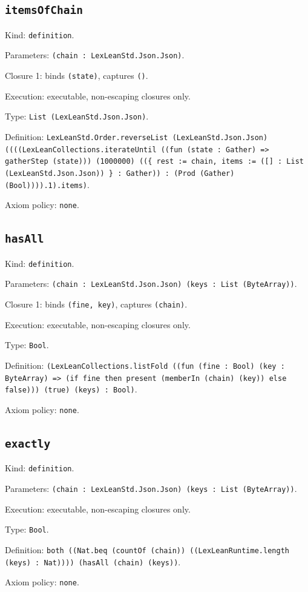 \documentclass[11pt]{article}
\begin{document}
\subsection*{\texttt{itemsOfChain}}
\noindent Kind: \texttt{definition}.\par
\noindent Parameters: \texttt{(chain : LexLeanStd.Json.Json)}.\par
\noindent Closure 1: binds \texttt{(state)}, captures \texttt{()}.\par
\noindent Execution: executable, non-escaping closures only.\par
\noindent Type: \texttt{List (LexLeanStd.Json.Json)}.\par
\noindent Definition: \texttt{LexLeanStd.Order.reverseList (LexLeanStd.Json.Json) ((((LexLeanCollections.iterateUntil ((fun (state : Gather) => gatherStep (state))) (1000000) ((\{ rest := chain, items := ([] : List (LexLeanStd.Json.Json)) \} : Gather)) : (Prod (Gather) (Bool)))).1).items)}.\par
\noindent Axiom policy: \texttt{none}.\par
\subsection*{\texttt{hasAll}}
\noindent Kind: \texttt{definition}.\par
\noindent Parameters: \texttt{(chain : LexLeanStd.Json.Json) (keys : List (ByteArray))}.\par
\noindent Closure 1: binds \texttt{(fine, key)}, captures \texttt{(chain)}.\par
\noindent Execution: executable, non-escaping closures only.\par
\noindent Type: \texttt{Bool}.\par
\noindent Definition: \texttt{(LexLeanCollections.listFold ((fun (fine : Bool) (key : ByteArray) => (if fine then present (memberIn (chain) (key)) else false))) (true) (keys) : Bool)}.\par
\noindent Axiom policy: \texttt{none}.\par
\subsection*{\texttt{exactly}}
\noindent Kind: \texttt{definition}.\par
\noindent Parameters: \texttt{(chain : LexLeanStd.Json.Json) (keys : List (ByteArray))}.\par
\noindent Execution: executable, non-escaping closures only.\par
\noindent Type: \texttt{Bool}.\par
\noindent Definition: \texttt{both ((Nat.beq (countOf (chain)) ((LexLeanRuntime.length (keys) : Nat)))) (hasAll (chain) (keys))}.\par
\noindent Axiom policy: \texttt{none}.\par
\end{document}
